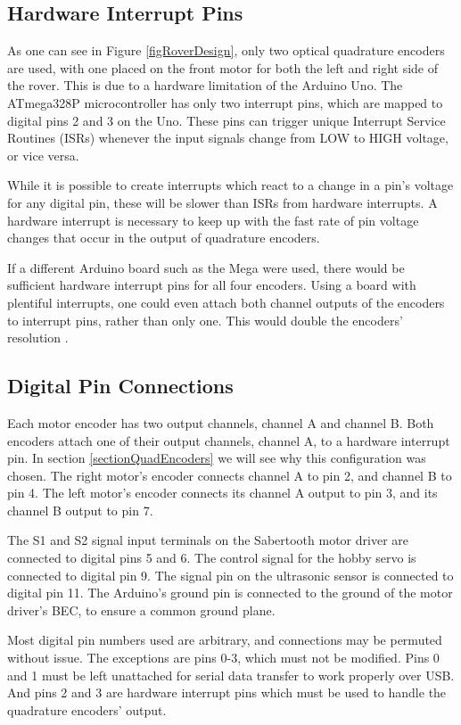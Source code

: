 \subsection{Hardware Interrupt Pins} \label{sectionHIP}
As one can see in Figure \ref{figRoverDesign}, only two optical quadrature encoders are used, with one placed on the front motor for both the left and right side of the rover. This is due to a hardware limitation of the Arduino Uno. The ATmega328P microcontroller has only two interrupt pins, which are mapped to digital pins 2 and 3 on the Uno. These pins can trigger unique Interrupt Service Routines (ISRs) whenever the input signals change from LOW to HIGH voltage, or vice versa.

While it is possible to create interrupts which react to a change in a pin's voltage for any digital pin, these will be slower than ISRs from hardware interrupts. A hardware interrupt is necessary to keep up with the fast rate of pin voltage changes that occur in the output of quadrature encoders.

If a different Arduino board such as the Mega were used, there would be sufficient hardware interrupt pins for all four encoders. Using a board with plentiful interrupts, one could even attach both channel outputs of the encoders to interrupt pins, rather than only one. This would double the encoders' resolution \cite{encoderBlog}.

\subsection{Digital Pin Connections}
Each motor encoder has two output channels, channel A and channel B. Both encoders attach one of their output channels, channel A, to a hardware interrupt pin. In section \ref{sectionQuadEncoders} we will see why this configuration was chosen. The right motor's encoder connects channel A to pin 2, and channel B to pin 4. The left motor's encoder connects its channel A output to pin 3, and its channel B output to pin 7. 

The S1 and S2 signal input terminals on the Sabertooth motor driver are connected to digital pins 5 and 6. The control signal for the hobby servo is connected to digital pin 9. The signal pin on the ultrasonic sensor is connected to digital pin 11. The Arduino's ground pin is connected to the ground of the motor driver's BEC, to ensure a common ground plane.

Most digital pin numbers used are arbitrary, and connections may be permuted without issue. The exceptions are pins 0-3, which must not be modified. Pins 0 and 1 must be left unattached for serial data transfer to work properly over USB. And pins 2 and 3 are hardware interrupt pins which must be used to handle the quadrature encoders' output.

